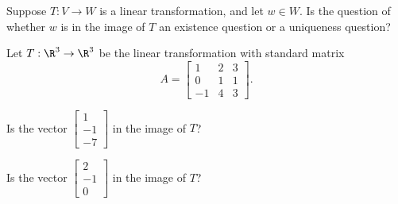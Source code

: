 
Suppose $T: V\rightarrow W$ is a linear transformation, and let $w\in W$.  Is the question 
of whether $w$ is in the image of $T$ an existence question or a uniqueness question?



\endedxproblem



Let $T: \R^3 \rightarrow \R^3$ be the linear transformation with standard matrix 
\[ A = \left[\begin{array}{ccc} 1 & 2 & 3 \\ 0 & 1 & 1 \\ -1 & 4 & 3  \end{array} \right]. \]

Is the vector $\left[\begin{array}{c} 1 \\ -1  \\ -7 \end{array} \right]$ in the image of $T$?



Is the vector $\left[\begin{array}{c} 2 \\ -1  \\ 0 \end{array} \right]$ in the image of $T$?



